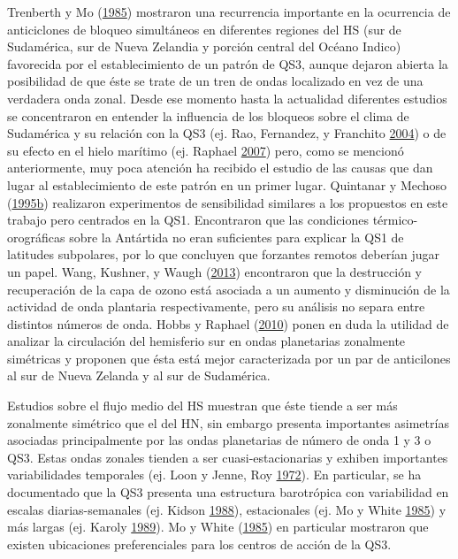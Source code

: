 \documentclass[spanish,a4paper,12p]{book}
\begin{document}
Trenberth y Mo (\protect\hyperlink{ref-Trenberth1985}{1985}) mostraron
una recurrencia importante en la ocurrencia de anticiclones de bloqueo
simultáneos en diferentes regiones del HS (sur de Sudamérica, sur de
Nueva Zelandia y porción central del Océano Indico) favorecida por el
establecimiento de un patrón de QS3, aunque dejaron abierta la
posibilidad de que éste se trate de un tren de ondas localizado en vez
de una verdadera onda zonal. Desde ese momento hasta la actualidad
diferentes estudios se concentraron en entender la influencia de los
bloqueos sobre el clima de Sudamérica y su relación con la QS3 (ej. Rao,
Fernandez, y Franchito \protect\hyperlink{ref-Rao2004}{2004}) o de su
efecto en el hielo marítimo (ej. Raphael
\protect\hyperlink{ref-Raphael2007a}{2007}) pero, como se mencionó
anteriormente, muy poca atención ha recibido el estudio de las causas
que dan lugar al establecimiento de este patrón en un primer lugar.
Quintanar y Mechoso
(\protect\hyperlink{ref-Quintanar1995}{1995}\protect\hyperlink{ref-Quintanar1995}{b})
realizaron experimentos de sensibilidad similares a los propuestos en
este trabajo pero centrados en la QS1. Encontraron que las condiciones
térmico-orográficas sobre la Antártida no eran suficientes para explicar
la QS1 de latitudes subpolares, por lo que concluyen que forzantes
remotos deberían jugar un papel. Wang, Kushner, y Waugh
(\protect\hyperlink{ref-Wang2013}{2013}) encontraron que la destrucción
y recuperación de la capa de ozono está asociada a un aumento y
disminución de la actividad de onda plantaria respectivamente, pero su
análisis no separa entre distintos números de onda. Hobbs y Raphael
(\protect\hyperlink{ref-Hobbs2010}{2010}) ponen en duda la utilidad de
analizar la circulación del hemisferio sur en ondas planetarias
zonalmente simétricas y proponen que ésta está mejor caracterizada por
un par de anticilones al sur de Nueva Zelanda y al sur de Sudamérica.

Estudios sobre el flujo medio del HS muestran que éste tiende a ser más
zonalmente simétrico que el del HN, sin embargo presenta importantes
asimetrías asociadas principalmente por las ondas planetarias de número
de onda 1 y 3 o QS3. Estas ondas zonales tienden a ser
cuasi-estacionarias y exhiben importantes variabilidades temporales (ej.
Loon y Jenne, Roy \protect\hyperlink{ref-Loon1972}{1972}). En
particular, se ha documentado que la QS3 presenta una estructura
barotrópica con variabilidad en escalas diarias-semanales (ej. Kidson
\protect\hyperlink{ref-Kidson1988}{1988}), estacionales (ej. Mo y White
\protect\hyperlink{ref-Mo1985}{1985}) y más largas (ej. Karoly
\protect\hyperlink{ref-Karoly1989}{1989}). Mo y White
(\protect\hyperlink{ref-Mo1985}{1985}) en particular mostraron que
existen ubicaciones preferenciales para los centros de acción de la QS3.
\end{document}
